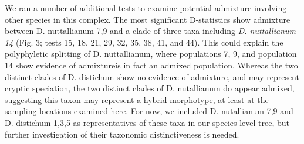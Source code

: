\documentclass[11pt]{article}
\begin{document}
We ran a number of additional tests to examine potential admixture involving other species in this complex. The most significant D-statistics show admixture between D. nuttallianum-7,9 and  a clade of three taxa including \emph{D. nuttallianum-14} (Fig. 3; tests 15, 18, 21, 29, 32, 35, 38, 41, and 44). This could explain the polyphyletic splitting of D. nuttallianum, where populations 7, 9, and population 14 show evidence of admixtureis in fact an admixed population. Whereas the two distinct clades of D. distichum show no evidence of admixture, and may represent cryptic speciation, the two distinct clades of D. nutallianum do appear admixed, suggesting this taxon may represent a hybrid morphotype, at least at the sampling locations examined here. For now, we included D. nutallianum-7,9 and D. distichum-1,3,5 as representatives of these taxa in our species-level tree, but further investigation of their taxonomic distinctiveness is needed.


\end{document}

